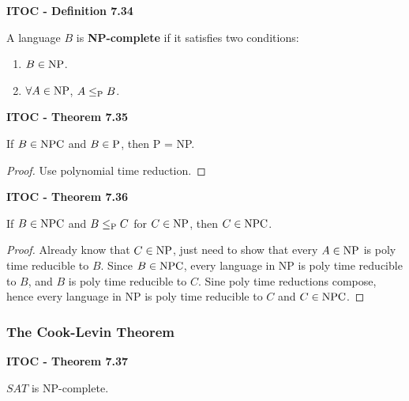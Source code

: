 \begin{shaded}
\textbf{ITOC - Definition 7.34}

\medskip
A language $B$ is \textbf{NP-complete} if it satisfies two conditions:
\begin{enumerate}
\item $B \in \NP$.
\item $\forall A \in \NP$, $A \leq_\P B$.
\end{enumerate}
\end{shaded}

\begin{shaded}
\textbf{ITOC - Theorem 7.35}

\medskip
If $B \in \NPC$ and $B \in \P$, then P = NP.
\end{shaded}

\begin{mdframed}
\begin{proof}
Use polynomial time reduction.
\end{proof}
\end{mdframed}

\begin{shaded}
\textbf{ITOC - Theorem 7.36}

\medskip
If $B\in \NPC$ and $B \leq_\P C$ for $C \in \NP$, then $C \in \NPC$.
\end{shaded}


\begin{mdframed}
\begin{proof}
Already know that $C \in \NP$, just need to show that every $A \in \NP$ is poly time reducible to $B$. Since $B \in \NPC$, every language in NP is poly time reducible to $B$, and $B$ is poly time reducible to $C$. Sine poly time reductions compose, hence every language in NP is poly time reducible to  $C$ and $C \in \NPC$.
\end{proof}
\end{mdframed}

\subsubsection{The Cook-Levin Theorem}

\label{lang:SAT}
\begin{shaded}
\textbf{ITOC - Theorem 7.37}

\medskip
$SAT$ is NP-complete.
\end{shaded}

